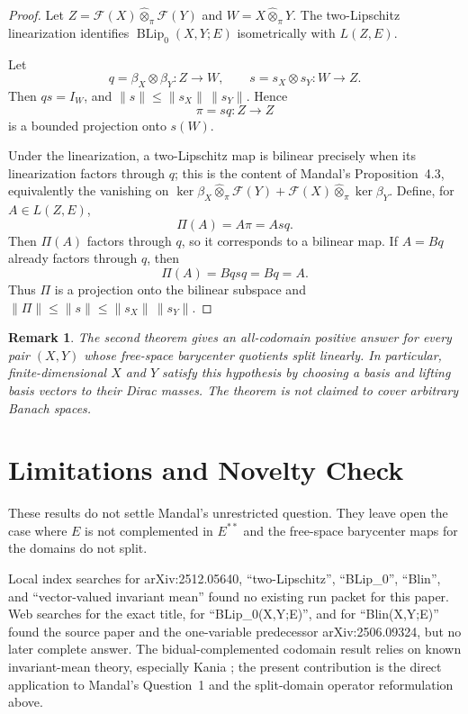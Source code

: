 \documentclass[11pt]{article}
\newtheorem{remark}{Remark}
\newcommand{\BLip}{\operatorname{BLip}}
\newcommand{\F}{\mathcal F}
\begin{document}
\begin{proof}
Let $Z=\F(X)\widehat\otimes_\pi\F(Y)$ and
$W=X\widehat\otimes_\pi Y$. The two-Lipschitz linearization identifies
$\BLip_0(X,Y;E)$ isometrically with $L(Z,E)$.

Let
\[
q=\beta_X\otimes\beta_Y:Z\to W,\qquad
s=s_X\otimes s_Y:W\to Z.
\]
Then $qs=I_W$, and $\|s\|\leq\|s_X\|\,\|s_Y\|$. Hence
\[
\pi=sq:Z\to Z
\]
is a bounded projection onto $s(W)$.

Under the linearization, a two-Lipschitz map is bilinear precisely when its
linearization factors through $q$; this is the content of Mandal's
Proposition~4.3, equivalently the vanishing on
$\ker\beta_X\widehat\otimes_\pi\F(Y)+
\F(X)\widehat\otimes_\pi\ker\beta_Y$.
Define, for $A\in L(Z,E)$,
\[
\Pi(A)=A\pi=Asq.
\]
Then $\Pi(A)$ factors through $q$, so it corresponds to a bilinear map. If
$A=Bq$ already factors through $q$, then
\[
\Pi(A)=Bqsq=Bq=A.
\]
Thus $\Pi$ is a projection onto the bilinear subspace and
$\|\Pi\|\leq\|s\|\leq\|s_X\|\,\|s_Y\|$.
\end{proof}

\begin{remark}
The second theorem gives an all-codomain positive answer for every pair
$(X,Y)$ whose free-space barycenter quotients split linearly. In particular,
finite-dimensional $X$ and $Y$ satisfy this hypothesis by choosing a basis and
lifting basis vectors to their Dirac masses. The theorem is not claimed to
cover arbitrary Banach spaces.
\end{remark}

\section*{Limitations and Novelty Check}

These results do not settle Mandal's unrestricted question. They leave open
the case where $E$ is not complemented in $E^{**}$ and the free-space
barycenter maps for the domains do not split.

Local index searches for arXiv:2512.05640, ``two-Lipschitz'', ``BLip\_0'',
``Blin'', and ``vector-valued invariant mean'' found no existing run packet
for this paper. Web searches for the exact title, for ``BLip\_0(X,Y;E)'', and
for ``Blin(X,Y;E)'' found the source paper and the one-variable predecessor
arXiv:2506.09324, but no later complete answer. The bidual-complemented
codomain result relies on known invariant-mean theory, especially Kania
\cite{kania}; the present contribution is the direct application to Mandal's
Question~1 and the split-domain operator reformulation above.
\end{document}

